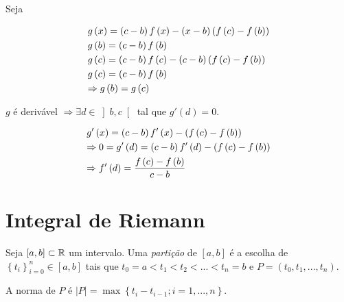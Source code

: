 \documentclass{book}
\begin{document}
\begin{dem}
Seja

\[
\begin{gathered}
  g\left( x \right) = \left( {c - b} \right)f\left( x \right) - \left( {x - b} \right)\left( {f\left( c \right) - f\left( b \right)} \right) \hfill \\
g\left( b \right) = \left( {c - b} \right)f\left( b \right) \hfill \\
  g\left( c \right) = \left( {c - b} \right)f\left( c \right) - \left( {c - b} \right)\left( {f\left( c \right) - f\left( b \right)} \right) \hfill \\
g\left( c \right) = \left( {c - b} \right)f\left( b \right) \hfill \\
\Rightarrow g\left( b \right) = g\left( c \right) \hfill \\
\end{gathered}
\]

    $g$ \'e deriv\'avel $\Rightarrow \exists d \in \left] {b,c} \right[$ tal que $g'\left( d \right) = 0$.

\[
\begin{gathered}
  g'\left( x \right) = \left( {c - b} \right)f'\left( x \right) - \left( {f\left( c \right) - f\left( b \right)} \right) \hfill \\
   \Rightarrow 0 = g'\left( d \right) = \left( {c - b} \right)f'\left( d \right) - \left( {f\left( c \right) - f\left( b \right)} \right) \hfill \\
   \Rightarrow \displaystyle f'\left( d \right) = \frac{{f\left( c \right) - f\left( b \right)}}
{{c - b}} \hfill \\
\end{gathered}
\]

\end{dem}


\section{Integral de Riemann} \label{sec05}

\begin{defn}
    Seja $\left[ {a,b} \right] \subset \mathbb{R}$ um intervalo. Uma \textit{parti\c c\~ao} de $\left[ {a,b} \right]$ \'e a escolha de $\left\{ {t_i } \right\}_{i = 0}^n  \in \left[ {a,b} \right]$ tais que $t_0  = a < t_1  < t_2  < ... < t_n  = b$ e $P = \left( {t_0 ,t_1 ,...,t_n } \right)$.

    A norma de $P$ \'e $\left| P \right| = \max \left\{ {t_i  - t_{i - 1} ;i = 1,...,n} \right\}$.
\end{defn}
\end{document}
